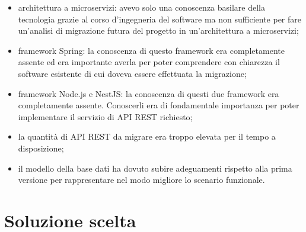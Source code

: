 \begin{itemize}
    \item architettura a microservizi: avevo solo una conoscenza basilare
          della tecnologia grazie al corso d'ingegneria del software ma non
          sufficiente per fare un'analisi di migrazione futura del progetto in un'architettura a microservizi;
    \item framework Spring: la conoscenza di questo framework era completamente assente
        ed era importante averla per poter comprendere con chiarezza il software esistente
        di cui doveva essere effettuata la migrazione;
    \item framework Node.js e NestJS: la conoscenza di questi due framework era completamente
        assente. Conoscerli era di fondamentale importanza per poter implementare il servizio
        di \gls{API} \gls{REST} richiesto;
    \item la quantità di \gls{API} \gls{REST} da migrare era troppo elevata per il tempo a disposizione;
    \item il modello della base dati ha dovuto subire adeguamenti rispetto alla prima versione
        per rappresentare nel modo migliore lo scenario funzionale.
\end{itemize}

\section{Soluzione scelta}

